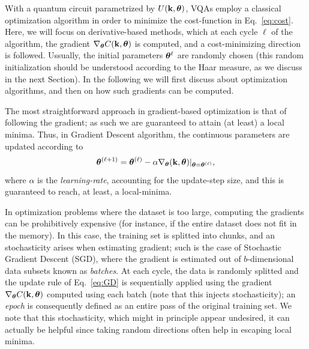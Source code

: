 With a quantum circuit parametrized by $U(\mathbf{k},\bm{\theta})$, VQAs employ a classical optimization algorithm in order to minimize the cost-function in Eq.~\eqref{eq:cost}. Here, we will focus on derivative-based methods, which at each cycle $\ell$ of the algorithm, the gradient $\nabla _{\bm{\theta}} C(\mathbf{k},\bm{\theta})$ is computed, and a cost-minimizing direction is followed. Ussually, the initial parameters $\bm{\theta}^{\ell}$ are randomly chosen (this random initialization should be understood according to the Haar measure, as we discuss in the next Section). In the following we will first discuss about optimization algorithms, and then on how such gradients can be computed.

The most straightforward approach in gradient-based optimization is that of following the gradient; as such we are guaranteed to attain (at least) a local minima. Thus, in Gradient Descent algorithm, the continuous parameters are updated according to
\begin{equation}\label{eq:GD}
\bm{\theta}^{(\ell + 1)} = \bm{\theta}^{(\ell)} - \alpha \nabla _{\bm{\theta}}(\mathbf{k},\bm{\theta})|_{\bm{\theta} = \bm{\theta}^{(\ell)}},
\end{equation}
where $\alpha$ is the \textit{learning-rate}, accounting for the update-step size, and this is guaranteed to reach, at least, a local-minima.

In optimization problems where the dataset is too large, computing the gradients can be prohibitively expensive (for instance, if the entire dataset does not fit in the memory). In this case, the training set is splitted into chunks, and an stochasticity arises when estimating gradient; such is the case of Stochastic Gradient Descent (SGD), where the gradient is estimated out of $b$-dimensional data subsets known as \textit{batches}. At each cycle, the data is randomly splitted and the update rule of Eq.~\ref{eq:GD} is sequentially applied using the gradient $\nabla _{\bm{\theta}} C(\mathbf{k},\bm{\theta})$ computed using each batch (note that this injects stochasticity); an \textit{epoch} is consequently defined as an entire pass of the original training set. We note that this stochasticity, which might in principle appear undesired, it can actually be helpful since taking random directions often help in escaping local minima.

